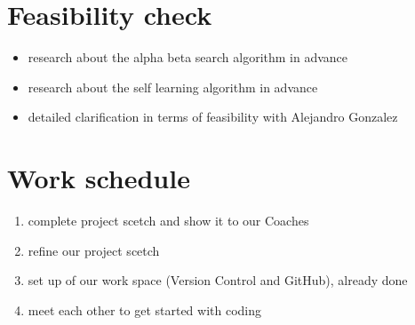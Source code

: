 \section{Feasibility check}
\begin{itemize}
    \item research about the alpha beta search algorithm in advance
    \item research about the self learning algorithm in advance
    \item detailed clarification in terms of feasibility with Alejandro Gonzalez
\end{itemize}


\section{Work schedule}
\begin{enumerate}
    \item complete project scetch and show it to our Coaches
    \item refine our project scetch
    \item set up of our work space (Version Control and GitHub), already done
    \item meet each other to get started with coding
\end{enumerate}


